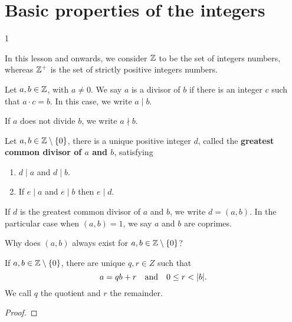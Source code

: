 \documentclass[11pt,a5paper]{article}
\begin{document}
\def\contador{1}


\section{Basic properties of the integers}
1

In this lesson and onwards, we consider $\mathbb{Z}$ to be the set of integers numbers, whereas $\mathbb{Z}^{+}$ is the set of strictly positive integers numbers.

\begin{defi}
Let $a,b\in \mathbb{Z}$, with $a\neq 0$. We say  $a$ is a divisor of $b$ if there is an integer $c$ such that $a\cdot c=b$. In this case, we write $a\mid b.$ 
\end{defi}

\begin{rem}
    If $a$ does not divide $b$, we write $a\nmid b$.
\end{rem}

\begin{teo}
    Let $a,b\in \mathbb{Z}\setminus\{0\}$, there is a unique positive integer $d$, called the \textbf{greatest common divisor of $a$ and $b$}, satisfying 
    \begin{enumerate}
        \item $d\mid a$ and $d\mid b.$
        \item If $e\mid a$ and $e\mid b$ then $e\mid d.$
    \end{enumerate}
\end{teo}

\begin{rem}
    If $d$ is the greatest common divisor of $a$ and $b$, we write $d=(a,b).$
    In the  particular case when  $(a,b)=1$, we say  $a$ and $b$ are coprimes.
\end{rem}

\begin{que}
    Why does $(a,b)$ always exist for $a,b\in \mathbb{Z}\setminus\{0\}$?
\end{que}


\begin{teo}
    If \(a,b\in \mathbb{Z}\setminus\{0\}\), 
    there are unique \(q,r\in Z\)
    such that 
    \[a= qb +r \quad\text{and}\quad 0\leq r < |b|.\]
    We call \(q\) the quotient and \(r\) the remainder.
\end{teo}

\begin{proof}
    
\end{proof}
\end{document}
